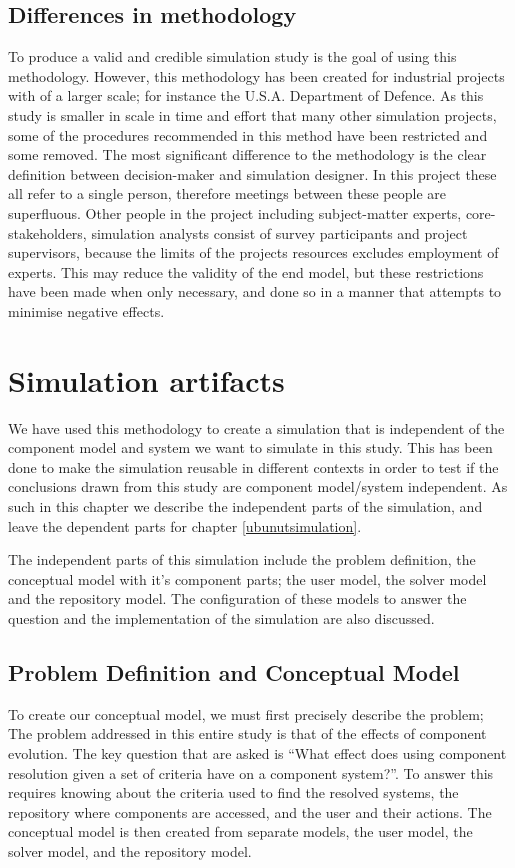\subsection{Differences in methodology}
To produce a valid and credible simulation study is the goal of using this methodology.
However, this methodology has been created for industrial projects with of a larger scale; for instance the U.S.A. Department of Defence.
As this study is smaller in scale in time and effort that many other simulation projects, some of the procedures recommended in this method have been restricted and some removed.
The most significant difference to the methodology is the clear definition between decision-maker and simulation designer.
In this project these all refer to a single person, therefore meetings between these people are superfluous.
Other people in the project including subject-matter experts, core-stakeholders, simulation analysts consist of survey participants and
project supervisors, because the limits of the projects resources excludes employment of experts.
This may reduce the validity of the end model, but these restrictions have been made when only necessary,
and done so in a manner that attempts to minimise negative effects.


\section{Simulation artifacts}
We have used this methodology to create a simulation that is independent of the component model and system we want to simulate in this study.
This has been done to make the simulation reusable in different contexts in order to test if the conclusions drawn from this study are component model/system independent.
As such in this chapter we describe the independent parts of the simulation, and leave the dependent parts for chapter \ref{ubunutsimulation}.

The independent parts of this simulation include the problem definition, the conceptual model with it's component parts;
the user model, the solver model and the repository model.
The configuration of these models to answer the question and the implementation of the simulation are also discussed.

\subsection{Problem Definition and Conceptual Model}
To create our conceptual model, we must first precisely describe the problem;
The problem addressed in this entire study is that of the effects of component evolution.
The key question that are asked is
``What effect does using component resolution given a set of criteria have on a component system?''.
To answer this requires knowing about the criteria used to find the resolved systems, the repository where components are accessed,
and the user and their actions.
The conceptual model is then created from separate models, the user model, the solver model, and the repository model.

